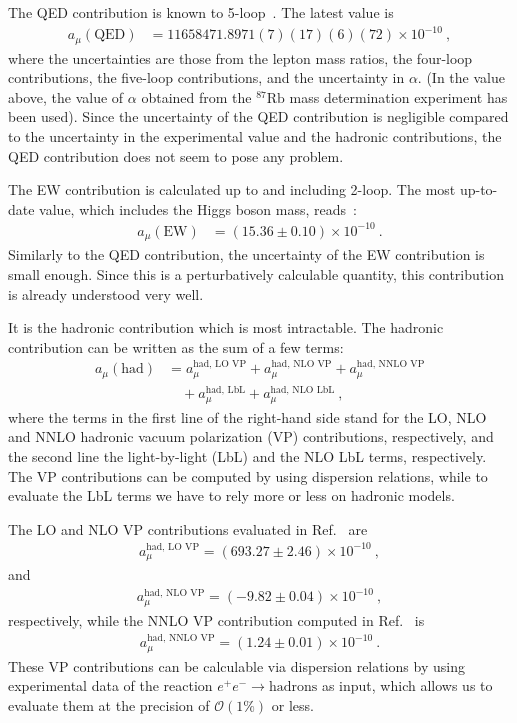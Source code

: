 The QED contribution is known to 5-loop~\cite{Aoyama-etal-2017}. 
The latest value is
%
\begin{align}
 a_\mu(\text{QED}) &=
  11 658 471.8971 (7)(17)(6)(72) \times 10^{-10} ~,
\label{eq:a_mu_QED}
\end{align}
%
where the uncertainties are those from the lepton mass ratios,
the four-loop contributions, the five-loop contributions,
and the uncertainty in $\alpha$.  (In the value above, the
value of $\alpha$ obtained from the ${}^{87}\text{Rb}$ mass
determination experiment has been used).  Since the uncertainty
of the QED contribution is negligible compared to the uncertainty 
in the experimental value and the hadronic contributions,
the QED contribution does not seem to pose any problem.


The EW contribution is calculated up to and including
2-loop.  The most up-to-date value, which includes 
the Higgs boson mass, reads~\cite{Gnendiger-etal}:
%
\begin{align}
 a_\mu(\text{EW}) &=  (15.36 \pm 0.10) \times 10^{-10} ~.
\label{eq:a_mu_EW}
\end{align}
%
Similarly to the QED contribution, the uncertainty of the EW
contribution is small enough.  Since this is a perturbatively
calculable quantity, this contribution is already understood
very well.

It is the hadronic contribution which is most intractable.
The hadronic contribution can be written as the sum of a 
few terms:
%
\begin{align}
   a_\mu(\text{had})
&= a_\mu^{\text{had, LO VP}} +  a_\mu^{\text{had, NLO VP}}
+  a_\mu^{\text{had, NNLO VP}} \nonumber \\
%
&\quad + a_\mu^{\text{had, LbL}} +  a_\mu^{\text{had, NLO LbL}}~,
%
\end{align}
%
where the terms in the first line of the right-hand side stand
for the LO, NLO and NNLO hadronic vacuum polarization (VP)
contributions, respectively, and the second line
the light-by-light (LbL) and the NLO LbL terms, respectively.
The VP contributions can be computed by using dispersion 
relations, while to evaluate the LbL terms we have to 
rely more or less on hadronic models.

The LO and NLO VP contributions evaluated in Ref.~\cite{KNT18}
are 
%
\begin{align}
 a_\mu^{\text{had, LO VP}}= (693.27 \pm 2.46) \times 10^{-10}~, 
\label{eq:a_mu_hadLOVP}
\end{align}
%
and
%
\begin{align}
a_\mu^{\text{had, NLO VP}}= (-9.82 \pm 0.04) \times 10^{-10}~, 
\label{eq:a_mu_hadNLOVP}
\end{align}
%
respectively, while the NNLO VP contribution computed 
in Ref.~\cite{Kurz-etal-hadNNLO} is
%
\begin{align}
a_\mu^{\text{had, NNLO VP}}= (1.24 \pm 0.01) \times 10^{-10}~.
\label{eq:a_mu_hadNNLOVP}
\end{align}
%
These VP contributions can be calculable via dispersion relations
by using experimental data of the reaction
$e^+e^- \to \text{hadrons}$ as input, 
which allows us to evaluate them at the precision of 
${\mathcal O}(1\%)$ or less.

